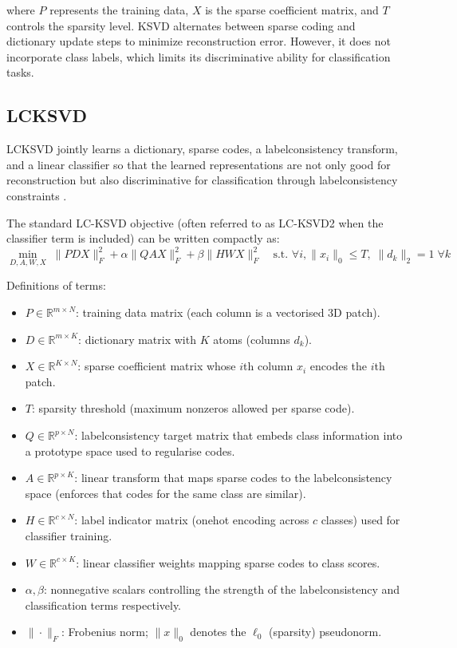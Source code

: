 where $P$ represents the training data, $X$ is the sparse coefficient matrix, and $T$ controls the sparsity level.
KSVD alternates between sparse coding and dictionary update steps to minimize reconstruction error.
However, it does not incorporate class labels, which limits its discriminative ability for classification tasks. \cite{ksvd}

\subsection{LCKSVD}
LCKSVD jointly learns a dictionary, sparse codes, a labelconsistency transform, and a linear classifier so that the learned
representations are not only good for reconstruction but also discriminative for classification through labelconsistency constraints \cite{jiang2013lcksvd}.

The standard LC-KSVD objective (often referred to as LC-KSVD2 when the classifier term is included) can be written compactly as:
\begin{equation}
\label{eq:lcksvd_obj}
\min_{D,A,W,X} \; \|P  D X\|_F^2 + \alpha \|Q  A X\|_F^2 + \beta \|H  W X\|_F^2 \quad \text{s.t. } \forall i, \|x_i\|_0 \le T, \; \|d_k\|_2 = 1 \; \forall k
\end{equation}

Definitions of terms:
\begin{itemize}
    \item $P \in \mathbb{R}^{m\times N}$: training data matrix (each column is a vectorised 3D patch).
    \item $D \in \mathbb{R}^{m\times K}$: dictionary matrix with $K$ atoms (columns $d_k$).
    \item $X \in \mathbb{R}^{K\times N}$: sparse coefficient matrix whose $i$th column $x_i$ encodes the $i$th patch.
    \item $T$: sparsity threshold (maximum nonzeros allowed per sparse code).
    \item $Q \in \mathbb{R}^{p\times N}$: labelconsistency target matrix that embeds class information into a prototype space used to regularise codes.
    \item $A \in \mathbb{R}^{p\times K}$: linear transform that maps sparse codes to the labelconsistency space (enforces that codes for the same class are similar).
    \item $H \in \mathbb{R}^{c\times N}$: label indicator matrix (onehot encoding across $c$ classes) used for classifier training.
    \item $W \in \mathbb{R}^{c\times K}$: linear classifier weights mapping sparse codes to class scores.
    \item $\alpha,\beta$: nonnegative scalars controlling the strength of the labelconsistency and classification terms respectively.
    \item $\|\cdot\|_F$: Frobenius norm; $\|x\|_0$ denotes the $\ell_0$ (sparsity) pseudonorm.
\end{itemize}

